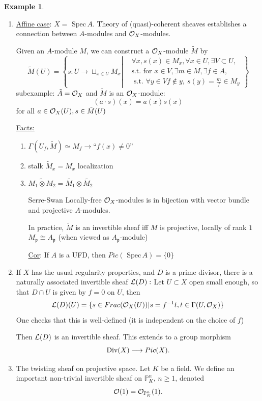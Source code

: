 \documentclass[11pt]{article}
\theoremstyle{definition}
\newtheorem{ex}[thm]{Example}
\newcommand{\spec}{\text{ Spec}\,}
\newcommand{\proj}{\mathbb P}
\newcommand{\scp}{{\mathfrak p}}
\newcommand{\call}{{\cal L}}
\newcommand{\calo}{{\cal O}}
\newcommand{\Div}{\textnormal{Div}}
\newcommand{\lrta}{\longrightarrow}
\begin{document}
\begin{ex}\ 
\begin{enumerate}[label=\boxed{\arabic*}]
\item \underline{Affine case}: $X=\spec A$. Theory of (quasi)-coherent sheaves establishes
 a connection between $A$-modules and $\calo_X$-modules.

Given an $A$-module $M$, we can construct a $\calo_X$-module  $\tilde{M}$ by 
$$
\tilde{M}(U)=\left\{s:U\lrta \sqcup_{x\in U}M_x\left|\begin{aligned}
&\forall x,s(x)\in M_x, \forall x\in U,\exists V\subset U
,\\
&\text{s.t. for } x\in V,\exists m\in M,\exists f\in A,\\ 
&\text{ s.t. } \forall y\in V f\notin y,\  s(y)=\frac{m}{f}\in M_y  
\end{aligned}
\right.\right\}
$$
subexample: $\tilde{A}=\calo_X$ and $\tilde{M}$ is an $\calo_X$-module:
$$
(a\cdot s)(x)=a(x)s(x)
$$
for all $a\in \calo_X(U), s\in \tilde{M}(U)$

\underline{Facts:}

\begin{enumerate}
\item $\Gamma(U_f,\tilde{M})\simeq M_f\lrta $``$f(x)\neq 0$''
\item stalk $\tilde{M}_x= M_x$ localization
\item $\widetilde{M_1\otimes M_2}=\tilde{M_1}\otimes\tilde{M_2}$
\item  [Serre-Swan] Locally-free $\calo_X$-modules is in bijection with vector bundle and  projective $A$-modules.

In practice, $\tilde{M}$ is an invertible sheaf iff $M$ is projective, locally of rank $1$ $M_\scp\cong A_\scp$ (when viewed as $A_\scp$-module)

\underline{Cor}: If $A$ is a UFD, then $Pic(\spec A)=\{0\}$
\end{enumerate}

\item If $X$ has the usual regularity properties, and $D$ is a prime divisor, there is a naturally associated invertible sheaf $\call(D):$ Let $U\subset X$ open small enough, so that $D\cap U$ is given by $f=0$ on $U$, then
$$
\call(D)(U)=\{s\in Frac(\calo_X(U))| s=f^{-1}t, t\in \Gamma(U, \calo_X)\}
$$
 One checks that this is well-defined (it is independent on the choice of $f$)

 Then $\call(D)$ is an invertible sheaf. This extends to a group morphism
 $$
  \Div(X)\lrta Pic(X).
 $$
 \item The twisting sheaf on projective space. Let $K$ be a field. We define an important non-trivial invertible sheaf on $\proj^n_K$, $n\geq 1$, denoted 
 $$
\calo(1)=\calo_{\proj^n_K}(1).
 $$


\end{enumerate}
\end{ex}
\end{document}
